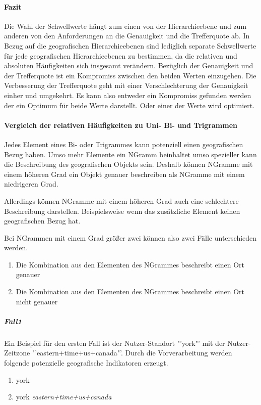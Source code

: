 			\paragraph{Fazit}

				Die Wahl der Schwellwerte hängt zum einen von der Hierarchieebene und zum anderen von den Anforderungen an die Genauigkeit und die Trefferquote ab.
				In Bezug auf die geografischen Hierarchieebenen sind lediglich separate Schwellwerte für jede geografischen Hierarchieebenen zu bestimmen, da die relativen und absoluten Häufigkeiten sich insgesamt verändern.
				Bezüglich der Genauigkeit und der Trefferquote ist ein Kompromiss zwischen den beiden Werten einzugehen. 
				Die Verbesserung der Trefferquote geht mit einer Verschlechterung der Genauigkeit einher und umgekehrt.
				Es kann also entweder ein Kompromiss gefunden werden der ein Optimum für beide Werte darstellt. 
				Oder einer der Werte wird optimiert.  

	
				\paragraph{Vergleich der relativen Häufigkeiten zu Uni- Bi- und Trigrammen}

					Jedes Element eines Bi- oder Trigrammes kann potenziell einen geografischen Bezug haben. 
					Umso mehr Elemente ein NGramm beinhaltet umso spezieller kann die Beschreibung des geografischen Objekts sein.
					Deshalb können NGramme mit einem höheren Grad ein Objekt genauer beschreiben als NGramme mit einem niedrigeren Grad.

					Allerdings können NGramme mit einem höheren Grad auch eine schlechtere Beschreibung darstellen. 
					Beispielsweise wenn das zusätzliche Element keinen geografischen Bezug hat.

					Bei NGrammen mit einem Grad größer zwei können also zwei Fälle unterschieden werden.

					\begin{enumerate}
						\item Die Kombination aus den Elementen des NGrammes beschreibt einen Ort genauer
						\item Die Kombination aus den Elementen des NGrammes beschreibt einen Ort nicht genauer
					\end{enumerate}

					\subparagraph{Fall1} 

						Ein Beispiel für den ersten Fall ist der Nutzer-Standort "'york"' mit der Nutzer-Zeitzone "'eastern+time+us+canada"'. 
						Durch die Vorverarbeitung werden folgende potenzielle geografische Indikatoren erzeugt.
						\begin{enumerate}		
							\item york
							\item york \textit{eastern+time+us+canada}
						\end{enumerate}		

